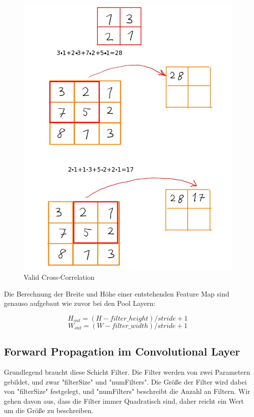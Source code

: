 \documentclass[12pt]{article}
\begin{document}
\begin{figure}[H]
\centering
\includegraphics[scale=0.5]{./Images/Valid_Correlation_005.jpg}
\caption{Valid Cross-Correlation}
\label{Full Correlation}
\end{figure}

Die Berechnung der Breite und Höhe einer entstehenden Feature Map sind genauso aufgebaut wie zuvor bei den Pool Layern:

$$H_{out} = (H - filter\_height)/stride + 1$$
$$W_{out} = (W - filter\_ width)/stride + 1$$












\cleardoublepage
\subsection{Forward Propagation im Convolutional Layer}
Grundlegend braucht diese Schicht Filter. Die Filter werden von zwei Parametern gebildet, und zwar "filterSize" und "numFilters". Die Größe der Filter wird dabei von "filterSize" festgelegt, und "numFilters" beschreibt die Anzahl an Filtern. Wir gehen davon aus, dass die Filter immer Quadratisch sind, daher reicht ein Wert um die Größe zu beschreiben.
\end{document}
